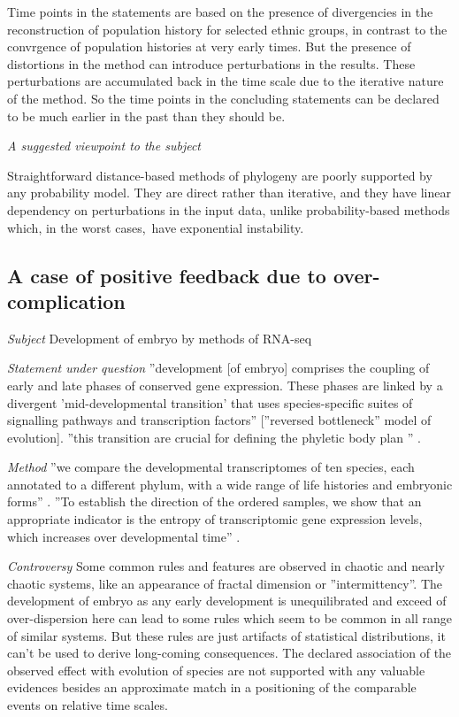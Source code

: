 \documentclass[12pt,aps]{revtex4}
\begin{document}
Time points in the statements are based on the presence of divergencies in the reconstruction of population history for selected ethnic groups, in contrast to the convrgence of population histories at very early times. But the presence of distortions in the method can introduce perturbations in the results. These perturbations are accumulated back in the time scale due to the iterative nature of the method. So the time points in the concluding statements can be declared to be much earlier in the past than they should be.

\emph{A suggested viewpoint to the subject}

Straightforward distance-based methods of phylogeny are poorly supported by any probability model. They are direct rather than iterative, and they have linear dependency on perturbations in the input data, unlike probability-based methods which, in the worst cases, have exponential instability. 

\subsection{A case of positive feedback due to over-complication}

\emph{Subject} Development of embryo by methods of RNA-seq

\emph{Statement under question}  ''development [of embryo] comprises the coupling of early and late phases of conserved gene expression. These phases are linked by a divergent 'mid-developmental transition' that uses species-specific suites of signalling pathways and transcription factors'' [''reversed bottleneck'' model of evolution]. ''this transition are crucial for defining the phyletic body plan '' \cite{CR2}.

\emph{Method} ''we compare the developmental transcriptomes of ten species, each annotated to a different phylum, with a wide range of life histories and embryonic forms'' \cite{CR2}. ''To establish the direction of the ordered samples, we show that an appropriate indicator is the entropy of transcriptomic gene expression levels, which increases over developmental time'' \cite{CR1}.

\emph{Controversy} Some common rules and features are observed in chaotic and nearly chaotic systems, like an appearance of  fractal dimension or ''intermittency''. The development of embryo as any early development is unequilibrated and exceed of over-dispersion here can lead to some rules which seem to be common in all range of similar systems. But these rules are just artifacts of statistical distributions, it can't be used to derive long-coming consequences. The declared association of the observed effect with evolution of species are not supported with any valuable evidences besides an approximate match in a positioning of the comparable events on relative time scales.
\end{document}
